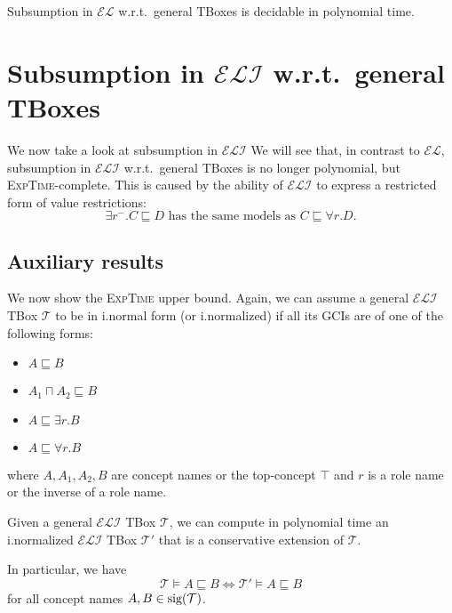 \begin{theorem}
		Subsumption in $\mathcal{EL}$ w.r.t.\ general TBoxes is decidable in polynomial time.
\end{theorem}

\newpage
\section{Subsumption in $\mathcal{ELI}$ w.r.t.\ general TBoxes}
We now take a look at subsumption in $\mathcal{ELI}$
We will see that, in contrast to $\mathcal{EL}$, subsumption in $\mathcal{ELI}$ w.r.t.\ general TBoxes
is no longer polynomial, but \textsc{ExpTime}-complete.
This is caused by the ability of $\mathcal{ELI}$ to express a restricted form of value restrictions:
\[
\exists r^-.C \sqsubseteq D \text{ has the same models as } C \sqsubseteq \forall r.D
.\]

\subsection{Auxiliary results}
We now show the \textsc{ExpTime} upper bound.
Again, we can assume a general $\mathcal{ELI}$ TBox $\mathcal{T}$ to be in i.normal form (or i.normalized)
if all its GCIs are of one of the following forms:
\begin{itemize}
	\item $A \sqsubseteq B$
	\item $A_1 \sqcap A_2 \sqsubseteq B$
	\item $A \sqsubseteq \exists r.B$
	\item $A \sqsubseteq \forall r.B$
\end{itemize}
where $A, A_1, A_2, B$ are concept names or the top-concept $\top$
and $r$ is a role name or the inverse of a role name.

\begin{corollary}
	Given a general $\mathcal{ELI}$ TBox $\mathcal{T}$, we can compute in polynomial time
	an i.normalized $\mathcal{ELI}$ TBox $\mathcal{T}'$ that is a conservative extension of $\mathcal{T}$.
	
	In particular, we have
	\[
	\mathcal{T} \vDash A \sqsubseteq B \iff \mathcal{T}' \vDash A \sqsubseteq B
	\]
	for all concept names $A, B \in \operatorname{\text{sig}}(\mathcal{T})$.
\end{corollary}

